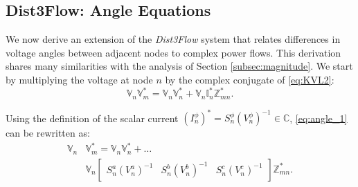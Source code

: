 \subsection{Dist3Flow: Angle Equations}
\label{subsec:angle}

We now derive an extension of the \emph{Dist3Flow} system that relates differences in voltage angles between adjacent nodes to complex power flows.  This derivation shares many similarities with the analysis of Section \ref{subsec:magnitude}.  We start by multiplying the voltage at node $n$ by the complex conjugate of \eqref{eq:KVL2}:
\begin{equation}
	\mathbb{V}_{n} \mathbb{V}_{m}^* = \mathbb{V}_{n} \mathbb{V}_{n}^* + \mathbb{V}_{n} \mathbb{I}_{n}^{*} \mathbb{Z}_{mn}^{*}.
    \label{eq:angle_1}
\end{equation}

\noindent Using the definition of the scalar current $(I^{\phi}_{n})^* = S_{n}^{\phi} (V_{n}^{\phi})^{-1} \in \mathbb C$, \eqref{eq:angle_1} can be rewritten as:
\begin{equation}
\begin{aligned}
	\mathbb{V}_{n} & \mathbb{V}_{m}^* = \mathbb{V}_{n} \mathbb{V}_{n}^* + \ldots \\
    & \mathbb{V}_{n}
    \begin{bmatrix}
    	S_{n}^{a} {\left( V_{n}^{a} \right)}^{-1} &
        S_{n}^{b} {\left( V_{n}^{b} \right)}^{-1} &
        S_{n}^{c} {\left( V_{n}^{c} \right)}^{-1}
    \end{bmatrix} \mathbb{Z}_{mn}^{*}.
    \label{eq:angle_2}
\end{aligned}
\end{equation}


